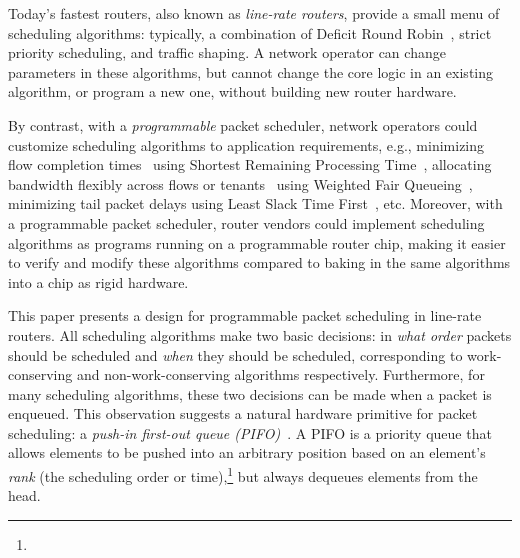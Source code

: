 
Today's fastest routers, also known as \textit{line-rate routers},
provide a small menu of scheduling algorithms: typically, a
combination of Deficit Round Robin~\cite{drr}, strict priority
scheduling, and traffic shaping. A network operator can change
parameters in these algorithms, but cannot change the core logic in an
existing algorithm, or program a new one, without building new router
hardware.

By contrast, with a {\em programmable} packet scheduler, network
operators could customize scheduling algorithms to application
requirements, e.g., minimizing flow completion times~\cite{pFabric}
using Shortest Remaining Processing Time~\cite{srpt}, allocating
bandwidth flexibly across flows or tenants~\cite{eyeq, faircloud}
using Weighted Fair Queueing~\cite{wfq}, minimizing tail packet delays
using Least Slack Time First~\cite{lstf}, etc. Moreover, with a
programmable packet scheduler, router vendors could implement
scheduling algorithms as programs running on a programmable router
chip, making it easier to verify and modify these algorithms compared to
baking in the same algorithms into a chip as rigid hardware.

This paper presents a design for programmable packet scheduling in
line-rate routers. All scheduling algorithms make two basic
decisions: in {\em what order} packets should be scheduled and {\em
  when} they should be scheduled, corresponding to work-conserving
and non-work-conserving algorithms respectively.  Furthermore, for many scheduling
algorithms, these two decisions can be made when a packet is
enqueued. 
This observation suggests a natural hardware primitive for packet
scheduling: a {\em push-in first-out queue
  (PIFO)}~\cite{pifo}. A PIFO is a priority queue that
allows elements to be pushed into an arbitrary position based on an
element's {\em rank} (the scheduling order or time),\footnote{} but always dequeues elements from the head.


